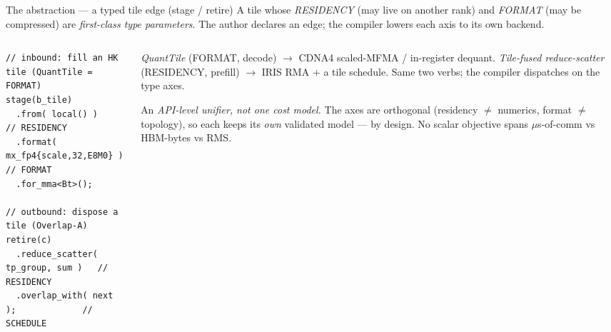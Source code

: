 \documentclass[pdf,aspectratio=169]{beamer}
\newcommand{\empy}[1]{{\color{darkorange}\emph{#1}}}
\newcommand{\empr}[1]{{\color{cardinalred}\emph{#1}}}
\newcommand{\examplebox}[2]{%
\begin{tcolorbox}[colframe=darkcardinal,colback=boxgray,title={#1}]
#2
\end{tcolorbox}}
\newcommand{\mc}[1]{{\ttfamily\small #1}}
\begin{document}
\begin{frame}[fragile]{The abstraction --- a typed tile edge (\mc{stage} / \mc{retire})}
\footnotesize
A tile whose \empr{RESIDENCY} (may live on another rank) and \empr{FORMAT} (may be compressed) are \empy{first-class type parameters}. The author declares an edge; the compiler lowers each axis to its own backend.
\begin{columns}
\begin{column}{0.54\textwidth}
\begin{lstlisting}
// inbound: fill an HK tile (QuantTile = FORMAT)
stage(b_tile)
  .from( local() )                   // RESIDENCY
  .format( mx_fp4{scale,32,E8M0} )   // FORMAT
  .for_mma<Bt>();

// outbound: dispose a tile (Overlap-A)
retire(c)
  .reduce_scatter( tp_group, sum )   // RESIDENCY
  .overlap_with( next );             // SCHEDULE
\end{lstlisting}
\end{column}
\begin{column}{0.46\textwidth}
\examplebox{Two lowerings, one declaration}{\scriptsize
\empy{QuantTile} (FORMAT, decode) $\to$ CDNA4 scaled-MFMA / in-register dequant. \empy{Tile-fused reduce-scatter} (RESIDENCY, prefill) $\to$ IRIS RMA $+$ a tile schedule. Same two verbs; the compiler dispatches on the type axes.}
\vspace{-1ex}
\examplebox{Honest boundary}{\scriptsize
An \empr{API-level unifier, not one cost model.} The axes are orthogonal (residency $\neq$ numerics, format $\neq$ topology), so each keeps its \emph{own} validated model --- by design. No scalar objective spans $\mu$s-of-comm vs HBM-bytes vs RMS.}
\end{column}
\end{columns}
\end{frame}
\end{document}
